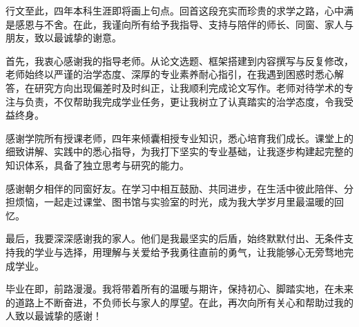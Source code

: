 \begin{newThanks}
    行文至此，四年本科生涯即将画上句点。回首这段充实而珍贵的求学之路，心中满是感恩与不舍。在此，我谨向所有给予我指导、支持与陪伴的师长、同窗、家人与朋友，致以最诚挚的谢意。

    首先，我衷心感谢我的指导老师。从论文选题、框架搭建到内容撰写与反复修改，老师始终以严谨的治学态度、深厚的专业素养耐心指引，在我遇到困惑时悉心解答，在研究方向出现偏差时及时纠正，让我顺利完成论文写作。老师对待学术的专注与负责，不仅帮助我完成学业任务，更让我树立了认真踏实的治学态度，令我受益终身。

    感谢学院所有授课老师，四年来倾囊相授专业知识，悉心培育我们成长。课堂上的细致讲解、实践中的悉心指导，为我打下坚实的专业基础，让我逐步构建起完整的知识体系，具备了独立思考与研究的能力。

    感谢朝夕相伴的同窗好友。在学习中相互鼓励、共同进步，在生活中彼此陪伴、分担烦恼，一起走过课堂、图书馆与实验室的时光，成为我大学岁月里最温暖的回忆。

    最后，我要深深感谢我的家人。他们是我最坚实的后盾，始终默默付出、无条件支持我的学业与选择，用理解与关爱给予我勇往直前的勇气，让我能够心无旁骛地完成学业。

    毕业在即，前路漫漫。我将带着所有的温暖与期许，保持初心、脚踏实地，在未来的道路上不断奋进，不负师长与家人的厚望。在此，再次向所有关心和帮助过我的人致以最诚挚的感谢！
\end{newThanks}
